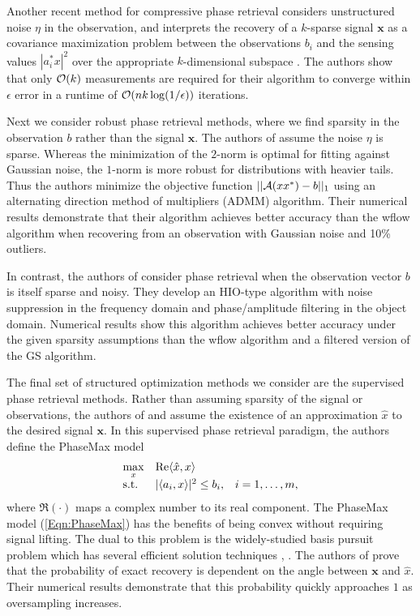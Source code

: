 Another recent method for compressive phase retrieval considers unstructured noise $\eta$ in the observation, and interprets the recovery of a $k$-sparse signal $\mathbf{x}$ as a covariance maximization problem between the observations $b_i$ and the sensing values $|a_i^*x|^2$ over the appropriate $k$-dimensional subspace \cite{zhang2017fast}.  
The authors show that only ${\mathcal O}(k)$ measurements are required for their algorithm to converge within $\epsilon$ error in a runtime of ${\mathcal O}(nk \log(1/ \epsilon))$ iterations.



Next we consider robust phase retrieval methods, where we find sparsity in the observation $b$ rather than the signal $\mathbf{x}$.  
The authors of \cite{jiang2017robust} assume the noise $\eta$ is sparse.  
Whereas the minimization of the $2$-norm is optimal for fitting against Gaussian noise, the $1$-norm is more robust for distributions with heavier tails.  
Thus the authors minimize the objective function $||{\mathcal A}(xx^*) - b||_1$ using an alternating direction method of multipliers (ADMM) algorithm.  
Their numerical results demonstrate that their algorithm achieves better accuracy than the wflow algorithm when recovering from an observation with Gaussian noise and 10\% outliers.

In contrast, the authors of \cite{katkovnik2017phase} consider phase retrieval when the observation vector $b$ is itself sparse and noisy.  
They develop an HIO-type algorithm with noise suppression in the frequency domain and phase/amplitude filtering in the object domain.  
Numerical results show this algorithm achieves better accuracy under the given sparsity assumptions than the wflow algorithm and a filtered version of the GS algorithm.



The final set of structured optimization methods we consider are the supervised phase retrieval methods.
Rather than assuming sparsity of the signal or observations, the authors of \cite{goldstein2018phasemax} and \cite{bahmani2016phase} assume the existence of an approximation $\hat{x}$ to the desired signal $\mathbf{x}$.  In this supervised phase retrieval paradigm, the authors define the PhaseMax model
\begin{equation} 			\label{Eqn:PhaseMax}
\begin{array}{lll}
	\max\limits_x	&	\mathrm{Re} \langle \hat{x}, x \rangle 		\\
	\textnormal{s.t.} 			&	| \langle a_i, x \rangle |^2 \leq b_i, 	&	i = 1, \ldots, m,
\end{array}
\end{equation} 
where $\Re(\cdot)$ maps a complex number to its real component.  The PhaseMax model (\ref{Eqn:PhaseMax}) has the benefits of being convex without requiring signal lifting.  The dual to this problem is the widely-studied basis pursuit problem which has several efficient solution techniques \cite{chen2001atomic}, \cite{candes2006stable}.  The authors of \cite{goldstein2018phasemax} prove that the probability of exact recovery is dependent on the angle between $\mathbf{x}$ and $\hat{x}$.
Their numerical results demonstrate that this probability quickly approaches $1$ as oversampling increases.




